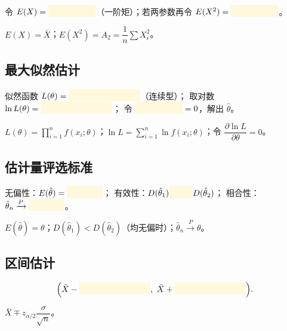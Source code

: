 \documentclass[11pt,a4paper]{article}
\newcommand{\blankbox}[1]{%
  \textcolor{blankyellow}{\rule[-0.1cm]{#1}{0.5cm}}%
}
\begin{document}
\begin{formulabox}[矩估计法]
令 $E(X)=\blankbox{2cm}$（一阶矩）；若两参数再令 $E(X^2)=\blankbox{2cm}$。
\end{formulabox}

\begin{answerbox}
$E(X)=\bar X$；$E(X^2)=A_2=\dfrac{1}{n}\sum X_i^2$。
\end{answerbox}

\subsection{最大似然估计}

\begin{formulabox}[最大似然估计]
似然函数 $L(\theta)=\blankbox{3cm}$（连续型）；
取对数 $\ln L(\theta)=\blankbox{3cm}$；
令 $\blankbox{2cm}=0$，解出 $\hat\theta$。
\end{formulabox}

\begin{answerbox}
$L(\theta)=\prod_{i=1}^n f(x_i;\theta)$；$\ln L=\sum_{i=1}^n \ln f(x_i;\theta)$；令 $\dfrac{\partial\ln L}{\partial\theta}=0$。
\end{answerbox}

\subsection{估计量评选标准}

\begin{formulabox}[三大标准]
无偏性：$E(\hat\theta)=\blankbox{1.5cm}$；
有效性：$D(\hat\theta_1)\blankbox{1cm} D(\hat\theta_2)$；
相合性：$\hat\theta_n\xrightarrow{P}\blankbox{1.5cm}$。
\end{formulabox}

\begin{answerbox}
$E(\hat\theta)=\theta$；$D(\hat\theta_1)<D(\hat\theta_2)$（均无偏时）；$\hat\theta_n\xrightarrow{P}\theta$。
\end{answerbox}

\subsection{区间估计}

\begin{formulabox}
\[\Bigl(\bar X - \blankbox{3cm},\ \bar X + \blankbox{3cm}\Bigr).\]
\end{formulabox}

\begin{answerbox}
$\bar X \mp z_{\alpha/2}\dfrac{\sigma}{\sqrt n}$。
\end{answerbox}
\end{document}
